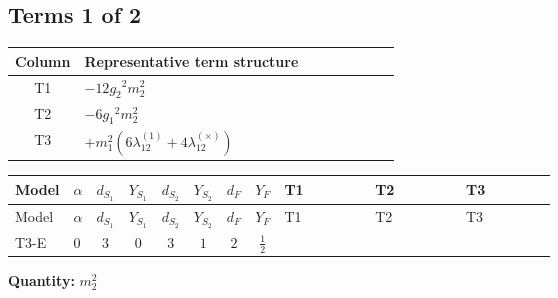 \documentclass[8pt]{article}
\begin{document}
\begin{landscape}
\subsection*{Terms 1 of 2}
\begin{center}
\begin{tabular}{@{}c >{\raggedright\arraybackslash}p{0.82\linewidth}@{}}
\toprule
Column & Representative term structure \\
\midrule
T1 & \(\displaystyle -12 {g_2}^2 {m_2^2}\) \\
\midrule
T2 & \(\displaystyle -6 {g_1}^2 {m_2^2}\) \\
\midrule
T3 & \(\displaystyle +{m_1^2} (6 {\lambda_{12}^{(1)}}+4 {\lambda_{12}^{(\times)}})\) \\
\midrule
\bottomrule
\end{tabular}
\end{center}
\smallskip
\tiny
\begin{longtable}{@{}llcccccc >{\raggedright\arraybackslash}p{0.21\linewidth} >{\raggedright\arraybackslash}p{0.21\linewidth} >{\raggedright\arraybackslash}p{0.21\linewidth}@{}}
\toprule
Model & $\alpha$ & $d_{S_1}$ & $Y_{S_1}$ & $d_{S_2}$ & $Y_{S_2}$ & $d_F$ & $Y_F$ & T1 & T2 & T3 \\
\midrule
\endfirsthead
\toprule
Model & $\alpha$ & $d_{S_1}$ & $Y_{S_1}$ & $d_{S_2}$ & $Y_{S_2}$ & $d_F$ & $Y_F$ & T1 & T2 & T3 \\
\midrule
\endhead
T3-E & $0$ & $3$ & $0$ & $3$ & $1$ & $2$ & $\frac{1}{2}$ & \scriptsize\adjustbox{max width=\linewidth}{$\begin{gathered} -12 {g_2}^2 {m_2^2}\end{gathered}$} & \scriptsize\adjustbox{max width=\linewidth}{$\begin{gathered} -6 {g_1}^2 {m_2^2}\end{gathered}$} & \scriptsize\adjustbox{max width=\linewidth}{$\begin{gathered} +{m_1^2} (6 {\lambda_{12}^{(1)}}+4 {\lambda_{12}^{(\times)}})\end{gathered}$} \\
\midrule
\bottomrule
\end{longtable}
\clearpage
\noindent\textbf{Quantity: }$m_2^2$\par\smallskip

\end{landscape}
\end{document}
